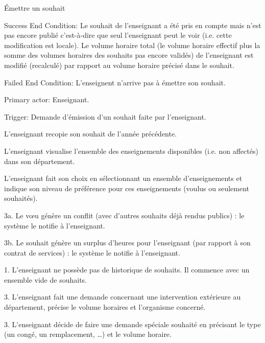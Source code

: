 \begin{ocl}
\begin{usecase}{\'Emettre un souhait}
\begin{information}
\item[{Success End Condition:}]
 Le souhait de l'enseignant a été pris en compte mais n'est pas encore publié c'est-à-dire que seul l'enseignant peut le voir (i.e. cette modification est locale). 
Le volume horaire total (le volume horaire effectif plus la somme des volumes horaires des souhaits pas encore validés) de l'enseignant est modifié (recalculé) par rapport au volume horaire précisé dans le souhait.

\item[{Failed End Condition:}] L'enseignent n'arrive pas à émettre son souhait.
\item[{Primary actor:}] Enseignant.
\item[{Trigger:}] Demande d'émission d'un souhait faite par l'enseignant.
\end{information}

 \begin{scenario}
	 \item L'enseignant recopie son souhait de l'année précédente.
	 \item L'enseignant visualise l'ensemble des enseignements disponibles (i.e. non affectés) dans son département.
	 \item L'enseignant fait son choix en sélectionnant un ensemble d'enseignements et indique son niveau de préférence pour ces enseignements (voulus ou seulement souhaités).
 \end{scenario}


\begin{extension}
 \item [3a.] Le vœu génère un conflit (avec d'autres souhaits déjà rendus publics) : le système le notifie à l'enseignant.
 \item [3b.] Le souhait génère un surplus d'heures pour l'enseignant (par rapport à son contrat de services) : le système le notifie à l'enseignant.
\end{extension}


\begin{variation}
	\item [1.] L'enseignant ne possède pas de historique de souhaits. Il commence avec un ensemble vide de souhaits.
	\item [3.] L'enseignant fait une demande concernant une intervention extérieure au département, précise le volume horaires et l'organisme concerné.
	\item [3.] L'enseignant décide de faire une demande spéciale souhaité en précisant le type (un congé, un remplacement, \dots) et le volume horaire.
\end{variation}
\end{usecase}


\end{ocl}
